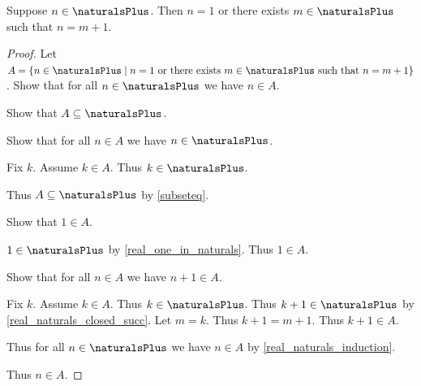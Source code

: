 \begin{lemma}\label{real_naturals_predecessor}
    Suppose $n\in\naturalsPlus$.
    Then $n = 1$ or there exists $m\in\naturalsPlus$ such that $n = m + 1$.
\end{lemma}
\begin{proof}
    Let $A = \{ n\in\naturalsPlus \mid \text{$n = 1$ or there exists $m\in\naturalsPlus$ such that $n = m + 1$}\}$.
    Show that for all $n\in\naturalsPlus$ we have $n\in A$.
    \begin{subproof}
        Show that $A\subseteq\naturalsPlus$.
        \begin{subproof}
            Show that for all $n\in A$ we have $n\in\naturalsPlus$.
            \begin{subproof}
                Fix $k$.
                Assume $k\in A$.
                Thus $k\in\naturalsPlus$.
            \end{subproof}
            Thus $A\subseteq\naturalsPlus$ by \cref{subseteq}.
        \end{subproof}
        Show that $1\in A$.
        \begin{subproof}
            $1\in\naturalsPlus$ by \cref{real_one_in_naturals}.
            Thus $1\in A$.
        \end{subproof}
        Show that for all $n\in A$ we have $n + 1\in A$.
        \begin{subproof}
            Fix $k$.
            Assume $k\in A$.
            Thus $k\in\naturalsPlus$.
            Thus $k + 1\in\naturalsPlus$ by \cref{real_naturals_closed_succ}.
            Let $m = k$.
            Thus $k + 1 = m + 1$.
            Thus $k + 1\in A$.
        \end{subproof}
        Thus for all $n\in\naturalsPlus$ we have $n\in A$ by \cref{real_naturals_induction}.
    \end{subproof}
    Thus $n\in A$.
\end{proof}


